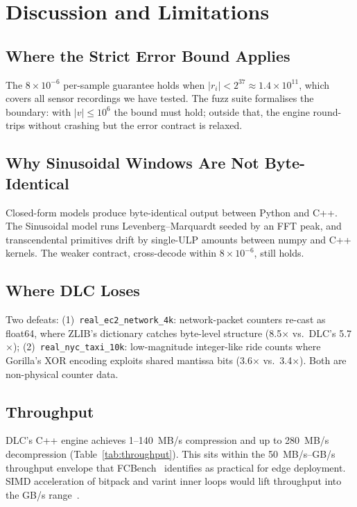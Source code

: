 \documentclass[runningheads]{llncs}
\begin{document}
\section{Discussion and Limitations}
\label{sec:discuss}

\subsection{Where the Strict Error Bound Applies}

The $8\times 10^{-6}$ per-sample guarantee holds when $|r_i| < 2^{37} \approx 1.4 \times 10^{11}$, which covers all sensor recordings we have tested. The fuzz suite formalises the boundary: with $|v| \le 10^6$ the bound must hold; outside that, the engine round-trips without crashing but the error contract is relaxed.

\subsection{Why Sinusoidal Windows Are Not Byte-Identical}

Closed-form models produce byte-identical output between Python and C++. The Sinusoidal model runs Levenberg--Marquardt seeded by an FFT peak, and transcendental primitives drift by single-ULP amounts between numpy and C++ kernels. The weaker contract, cross-decode within $8\times 10^{-6}$, still holds.

\subsection{Where DLC Loses}

Two defeats: (1)~\texttt{real\_ec2\_network\_4k}: network-packet counters re-cast as float64, where ZLIB's dictionary catches byte-level structure (8.5$\times$ vs.\ DLC's 5.7$\times$); (2)~\texttt{real\_nyc\_taxi\_10k}: low-magnitude integer-like ride counts where Gorilla's XOR encoding exploits shared mantissa bits (3.6$\times$ vs.\ 3.4$\times$). Both are non-physical counter data.

\subsection{Throughput}

DLC's C++ engine achieves 1--140~MB/s compression and up to 280~MB/s decompression (Table~\ref{tab:throughput}). This sits within the 50~MB/s--GB/s throughput envelope that FCBench~\cite{fcbench2024} identifies as practical for edge deployment. SIMD acceleration of bitpack and varint inner loops would lift throughput into the GB/s range~\cite{lemire2015}.
\end{document}

